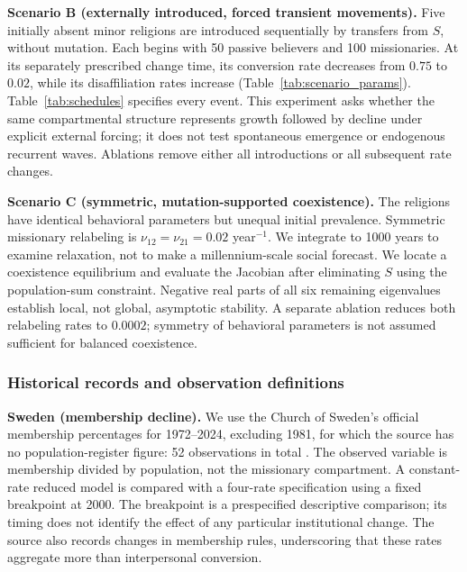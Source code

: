 \documentclass[11pt,a4paper]{article}
\begin{document}
\textbf{Scenario B (externally introduced, forced transient movements).}
Five initially absent minor religions are introduced sequentially by transfers from $S$, without mutation. Each begins with 50 passive believers and 100 missionaries. At its separately prescribed change time, its conversion rate decreases from $0.75$ to $0.02$, while its disaffiliation rates increase (Table~\ref{tab:scenario_params}). Table~\ref{tab:schedules} specifies every event. This experiment asks whether the same compartmental structure represents growth followed by decline under explicit external forcing; it does not test spontaneous emergence or endogenous recurrent waves. Ablations remove either all introductions or all subsequent rate changes.


\textbf{Scenario C (symmetric, mutation-supported coexistence).}
The religions have identical behavioral parameters but unequal initial prevalence. Symmetric missionary relabeling is $\nu_{12}=\nu_{21}=0.02$ year$^{-1}$. We integrate to 1000 years to examine relaxation, not to make a millennium-scale social forecast. We locate a coexistence equilibrium and evaluate the Jacobian after eliminating $S$ using the population-sum constraint. Negative real parts of all six remaining eigenvalues establish local, not global, asymptotic stability. A separate ablation reduces both relabeling rates to $0.0002$; symmetry of behavioral parameters is not assumed sufficient for balanced coexistence.

\subsubsection{Historical records and observation definitions}
\label{subsec:hist_fit}
\textbf{Sweden (membership decline).}
We use the Church of Sweden's official membership percentages for 1972--2024, excluding 1981, for which the source has no population-register figure: 52 observations in total \cite{svenskakyrkan_membership_1972_2024}. The observed variable is membership divided by population, not the missionary compartment. A constant-rate reduced model is compared with a four-rate specification using a fixed breakpoint at 2000. The breakpoint is a prespecified descriptive comparison; its timing does not identify the effect of any particular institutional change. The source also records changes in membership rules, underscoring that these rates aggregate more than interpersonal conversion.
\end{document}
